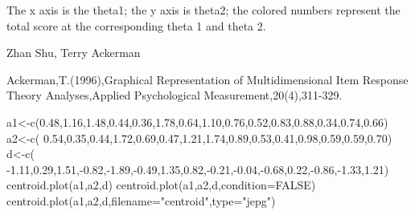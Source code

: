\begin{Value}
The x axis is the theta1; the y axis is theta2; the colored numbers represent the total score at the corresponding theta 1 and theta 2.
\end{Value}
\begin{Author}\relax
Zhan Shu, Terry Ackerman
\end{Author}
\begin{References}\relax
Ackerman,T.(1996),Graphical Representation of Multidimensional Item Response Theory Analyses,Applied Psychological Measurement,20(4),311-329.
\end{References}
\begin{Examples}
\begin{ExampleCode}
a1<-c(0.48,1.16,1.48,0.44,0.36,1.78,0.64,1.10,0.76,0.52,0.83,0.88,0.34,0.74,0.66)
a2<-c( 0.54,0.35,0.44,1.72,0.69,0.47,1.21,1.74,0.89,0.53,0.41,0.98,0.59,0.59,0.70)
d<-c( -1.11,0.29,1.51,-0.82,-1.89,-0.49,1.35,0.82,-0.21,-0.04,-0.68,0.22,-0.86,-1.33,1.21)
centroid.plot(a1,a2,d)
centroid.plot(a1,a2,d,condition=FALSE)
centroid.plot(a1,a2,d,filename="centroid",type="jepg")
\end{ExampleCode}
\end{Examples}

